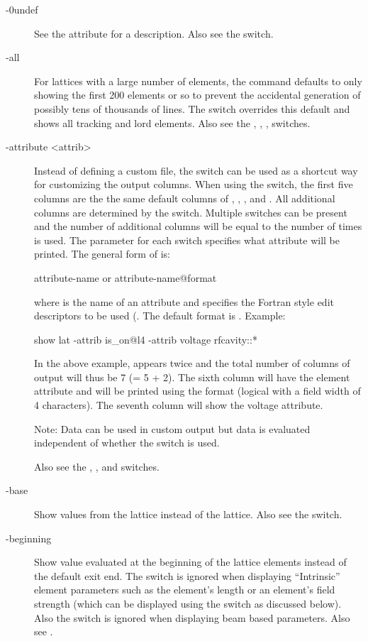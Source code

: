 {{{{{{{{\begin{description}
\item[-0undef] \Newline
See the  attribute for a description. Also see the  switch.
%
\item[-all] \Newline
For lattices with a large number of elements, the  command defaults to only showing
the first 200 elements or so to prevent the accidental generation of possibly tens of thousands of
lines. The  switch overrides this default and shows all tracking and lord elements. Also
see the , , ,  switches.
%
\item[-attribute <attrib>] \Newline
Instead of defining a custom file, the  switch can be used as a shortcut way
for customizing the output columns.  When using the  switch, the first five columns
are the the same default columns of , , ,  and
. All additional columns are determined by the  switch. Multiple
 switches can be present and the number of additional columns will be equal to the
number of times  is used.  The  parameter for each 
switch specifies what attribute will be printed.  The general form of  is:
\begin{example}
  attribute-name         or
  attribute-name@format
\end{example}
where  is the name of an attribute and  specifies the Fortran style
edit descriptors to be used (. The default format is .  Example:
\begin{example}
  show lat -attrib is_on@l4 -attrib voltage rfcavity::*
\end{example}
In the above example,  appears twice and the total number of columns of output will
thus be 7 (= 5 + 2). The sixth column will have the  element attribute and will be printed
using the  format (logical with a field width of 4 characters). The seventh column will show
the voltage attribute.

Note: Data can be used in custom output but data is evaluated independent of whether the
 switch is used.

Also see the , , and  switches.
%
\item[-base] \Newline
  Show values from the  lattice instead of the  lattice. Also see the  switch.
%
\item[-beginning] \Newline
Show value evaluated at the beginning of the lattice elements instead of the default exit end.  The
 switch is ignored when displaying ``Intrinsic'' element parameters such as the
element's length or an element's field strength (which can be displayed using the 
switch as discussed below). Also the  switch is ignored when displaying beam based
parameters. Also see .


\end{description}}}}}}}}}
